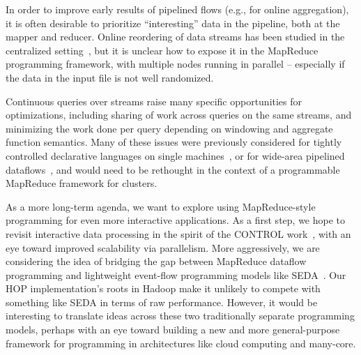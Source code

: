 In order to improve early results of pipelined flows (e.g., for online aggregation), it is often desirable 
to prioritize ``interesting'' data in the pipeline, both at the mapper and reducer.  Online reordering of 
data streams has been studied in the centralized setting~\cite{juggle}, but it is unclear how to expose it 
in the MapReduce programming framework, with multiple nodes running in parallel -- especially if the data 
in the input file is not well randomized.  

Continuous queries over streams raise many specific opportunities for optimizations, including sharing of 
work across queries on the same streams, and minimizing the work done per query depending on windowing 
and aggregate function semantics. Many of these issues were previously considered for tightly controlled 
declarative languages on single machines~\cite{stream,tcq-cidr}, or for wide-area pipelined 
dataflows~\cite{borealis,sbon}, and would need to be rethought in the context of a programmable MapReduce 
framework for clusters.

As a more long-term agenda, we want to explore using MapReduce-style programming for even more interactive 
applications.  As a first step, we hope to revisit interactive data processing in the spirit of the 
CONTROL work~\cite{ieeecontrol}, with an eye toward improved scalability via parallelism.  More aggressively, 
we are considering the idea of bridging the gap between MapReduce dataflow programming and lightweight event-flow 
programming models like SEDA~\cite{seda}.  Our HOP implementation's roots in Hadoop make it unlikely to compete 
with something like SEDA in terms of raw performance. However, it would be interesting to translate ideas across 
these two traditionally separate programming models, perhaps with an eye toward building a new and more 
general-purpose framework for programming in architectures like cloud computing and many-core.


